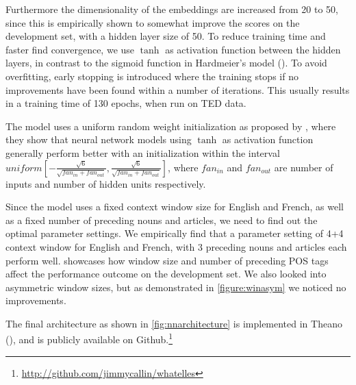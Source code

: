 \documentclass[11pt]{article}
\begin{document}
Furthermore the dimensionality of the embeddings are increased from 20 to 50, since this is empirically shown to somewhat improve the scores on the development set, with a hidden layer size of 50.
To reduce training time and faster find convergence, we use $\tanh$ as activation function between the hidden layers, in contrast to the sigmoid function in Hardmeier's model (\cite{Lecun2012Efficient}).
To avoid overfitting, early stopping is introduced where the training stops if no improvements have been found within a number of iterations.
This usually results in a training time of 130 epochs, when run on TED data.

The model uses a uniform random weight initialization as proposed by \textcite{Glorot2010Understanding}, where they show that neural network models using $\tanh$ as activation function generally perform better with an initialization within the interval $uniform[-\frac{\sqrt{6}}{\sqrt{fan_{in}+fan_{out}}},\frac{\sqrt{6}}{\sqrt{fan_{in}+fan_{out}}}]$, where $fan_{in}$ and $fan_{out}$ are number of inputs and number of hidden units respectively.

Since the model uses a fixed context window size for English and French, as well as a fixed number of preceding nouns and articles, we need to find out the optimal parameter settings. We empirically find that a parameter setting of 4+4 context window for English and French, with 3 preceding nouns and articles each perform well.  showcases how window size and number of preceding POS tags affect the performance outcome on the development set. We also looked into asymmetric window sizes, but as demonstrated in \cref{figure:winasym} we noticed no improvements.

The final architecture as shown in \cref{fig:nnarchitecture} is implemented in Theano (\cite{Bergstra2010Theano}), and is publicly available on Github.\footnote{\url{http://github.com/jimmycallin/whatelles}}
\end{document}
